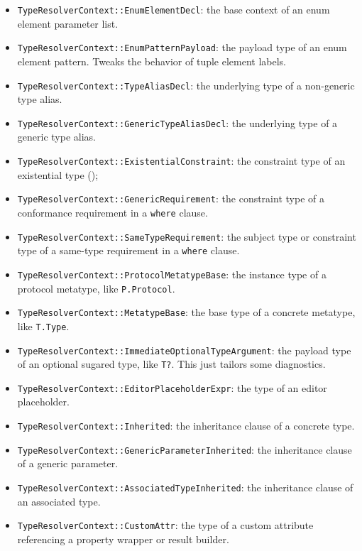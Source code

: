 \documentclass[../generics]{subfiles}
\begin{document}
\begin{itemize}
\item \texttt{TypeResolverContext::EnumElementDecl}: the base context of an enum element parameter list.
\item \texttt{TypeResolverContext::EnumPatternPayload}: the payload type of an enum element pattern. Tweaks the behavior of tuple element labels.
\item \texttt{TypeResolverContext::TypeAliasDecl}: the underlying type of a non-generic type alias.
\item \texttt{TypeResolverContext::GenericTypeAliasDecl}: the underlying type of a generic type alias.
\item \texttt{TypeResolverContext::ExistentialConstraint}: the constraint type of an existential type ();
\item \texttt{TypeResolverContext::GenericRequirement}: the constraint type of a conformance requirement in a \texttt{where} clause.
\item \texttt{TypeResolverContext::SameTypeRequirement}: the subject type or constraint type of a same-type requirement in a \texttt{where} clause.
\item \texttt{TypeResolverContext::ProtocolMetatypeBase}: the instance type of a protocol metatype, like \texttt{P.Protocol}.
\item \texttt{TypeResolverContext::MetatypeBase}: the base type of a concrete metatype, like \texttt{T.Type}.
\item \texttt{TypeResolverContext::ImmediateOptionalTypeArgument}: the payload type of an optional sugared type, like \texttt{T?}. This just tailors some diagnostics.
\item \texttt{TypeResolverContext::EditorPlaceholderExpr}: the type of an editor placeholder.
\item \texttt{TypeResolverContext::Inherited}: the inheritance clause of a concrete type.
\item \texttt{TypeResolverContext::GenericParameterInherited}: the inheritance clause of a generic parameter.
\item \texttt{TypeResolverContext::AssociatedTypeInherited}: the inheritance clause of an associated type.
\item \texttt{TypeResolverContext::CustomAttr}: the type of a custom attribute referencing a property wrapper or result builder.
\end{itemize}
\end{document}
